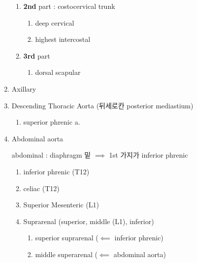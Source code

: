 \documentclass[10pt]{amsart}
\numberwithin{theorem}{section}
\numberwithin{example}{section}
\theoremstyle{definition}
\theoremstyle{remark}
\begin{document}
\begin{enumerate}
\begin{enumerate}
    \item \textbf{2nd} part 
 :     costocervical trunk
    \begin{enumerate}
        \item deep cervical 
        
        \item highest intercostal 
    \end{enumerate}
    
    \item \textbf{3rd} part 
    
    \begin{enumerate}
        \item dorsal scapular 
    \end{enumerate}
\end{enumerate}


\vspace{3pt}


\item  Axillary 



\vspace{3pt}

\item Descending Thoracic Aorta (뒤세로칸 posterior mediastium)

\vspace{3pt}

\begin{enumerate}
    \item 
    superior phrenic a. 
    
\end{enumerate}

\vspace{3pt}

\item Abdominal aorta


abdominal : diaphragm 밑  $\implies $ 1st 가지가 inferior phrenic


\begin{enumerate}
\item inferior phrenic (T12)

\vspace{1.5pt}

\item  celiac (T12)


\vspace{1.5pt}

\item  Superior Mesenteric (L1)

\item Suprarenal (superior, middle (L1), inferior) 
\begin{enumerate}
    \item superior suprarenal ($\impliedby$ inferior phrenic)
    \item middle superarenal ($\impliedby$ abdominal aorta)
    

\end{enumerate}
\end{enumerate}
\end{enumerate}
\end{document}
